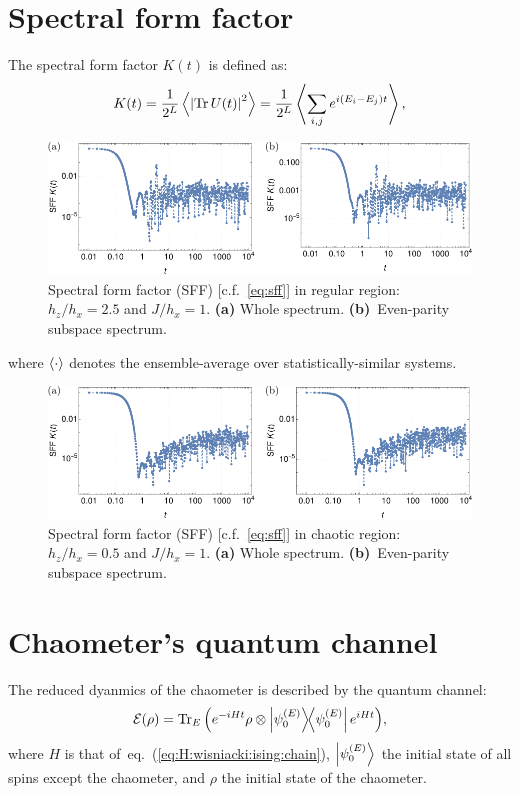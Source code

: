 \documentclass[10pt,letterpaper]{article}
\newcommand{\eref}[1]{eq.~(\ref{#1})}
\newcommand{\mcE}{\mathcal E}
\begin{document}
\section{Spectral form factor}
The spectral form factor $K(t)$ is defined as:
\begin{equation}\label{eq:sff}
K(t) = 
\frac{1}{2^L}
\expval{
\abs{\Tr U(t) }^2
} = 
\frac{1}{2^L}
\expval{
\sum_{i,j} 
e^{i(E_i - E_j) t}
},
\end{equation}
\begin{figure}
\centering
\includegraphics[width=\textwidth]{sff_regular.pdf}
\caption{Spectral form factor (SFF) [c.f.~\eqref{eq:sff}] in regular region: $h_z/h_x=2.5$ and 
$J/h_x=1$. \textbf{(a)} Whole spectrum. \textbf{(b)}~Even-parity subspace 
spectrum.}
\label{fig:sff:regular}
\end{figure}
where $\expval{\cdot}$ denotes the ensemble-average over statistically-similar
systems.

\begin{figure}
\centering
\includegraphics[width=\textwidth]{sff_chaotic.pdf}
\caption{Spectral form factor (SFF) [c.f.~\eqref{eq:sff}] in chaotic region: $h_z/h_x=0.5$ and 
$J/h_x=1$. \textbf{(a)} Whole spectrum. \textbf{(b)}~Even-parity subspace 
spectrum.}
\label{fig:sff:chaotic}
\end{figure}

\section{Chaometer's quantum channel}
The reduced dyanmics of the chaometer is described by the quantum channel: 
\begin{equation}\label{eq:chaometer:channel}
\mcE(\rho) = 
\Tr_E \qty(
e^{-i H t}
\rho \otimes \dyad{\psi_0^{(E)}}
e^{i H t}
),
\end{equation}
where $H$ is that of~\eref{eq:H:wisniacki:ising:chain}, $\ket{\psi_0^{(E)}}$
the initial state of all spins except the chaometer, and $\rho$ the initial 
state of the chaometer. 
\end{document}
